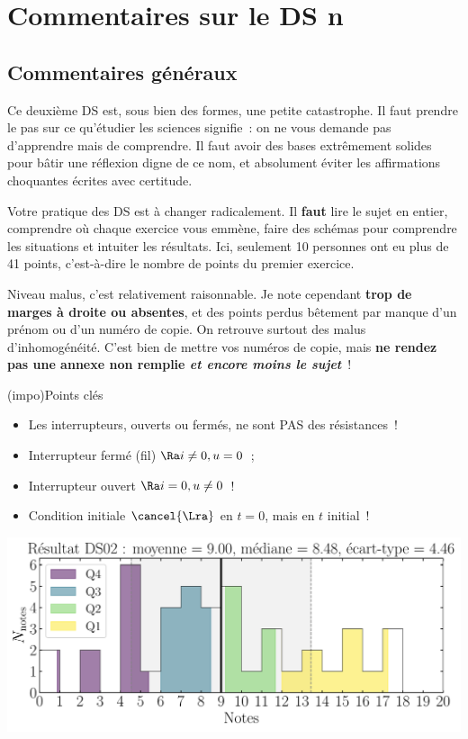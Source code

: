 \documentclass[a4paper, 10pt, final, garamond]{book}
\begin{document}
\setcounter{chapter}{1}

\chapter{Commentaires sur le DS n}

\section{Commentaires généraux}

Ce deuxième DS est, sous bien des formes, une petite catastrophe. Il faut
prendre le pas sur ce qu'étudier les sciences signifie~: on ne vous demande pas
d'apprendre mais de comprendre. Il faut avoir des bases extrêmement solides pour
bâtir une réflexion digne de ce nom, et absolument éviter les affirmations
choquantes écrites avec certitude.

Votre pratique des DS est à changer radicalement. Il \textbf{faut} lire le sujet
en entier, comprendre où chaque exercice vous emmène, faire des schémas pour
comprendre les situations et intuiter les résultats. Ici, seulement 10 personnes
ont eu plus de 41 points, c'est-à-dire le nombre de points du premier exercice.

Niveau malus, c'est relativement raisonnable. Je note cependant \textbf{trop de
	marges à droite ou absentes}, et des points perdus bêtement par manque d'un
prénom ou d'un numéro de copie. On retrouve surtout des malus d'inhomogénéité.
C'est bien de mettre vos numéros de copie, mais \textbf{ne rendez pas une annexe
	non remplie \textit{et encore moins le sujet}}~!

\begin{tcb}[bld,cnt,fontupper=\Large](impo){Points clés}
	\begin{itemize}
		\item Les interrupteurs, ouverts ou fermés, ne sont PAS des résistances~!
		\item Interrupteur fermé (fil) $\Ra i \neq 0, u = 0$~;
		\item Interrupteur ouvert $\Ra i=0, u \neq 0$~!
		\item Condition initiale $\cancel{\Lra}$ en $t=0$, mais en $t$ initial~!
	\end{itemize}
\end{tcb}

\begin{center}
	\includegraphics[width=.7\linewidth]{DS02_rslt.pdf}
\end{center}
\end{document}
